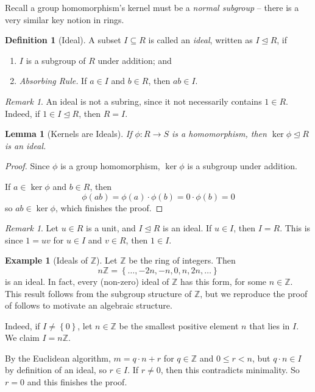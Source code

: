 \documentclass{article}
\newtheorem{lemma}[theorem]{Lemma}
\theoremstyle{definition}
\newtheorem{definition}[theorem]{Definition}
\newtheorem{example}[theorem]{Example}
\theoremstyle{remark}
\newtheorem{remark}[theorem]{Remark}
\newcommand{\pqty}[1]{\left(#1\right)}
\newcommand{\Bqty}[1]{\left\{#1\right\}}
\newcommand{\functiondomain}[3]{#1:#2\to #3}
\newcommand{\idealsub}{\trianglelefteq}
\newcommand{\ZZ}{\mathbb{Z}}
\begin{document}
Recall a group homomorphism's kernel must be a \emph{normal subgroup} -- there is a very similar key notion in rings.

\begin{definition}[Ideal]
    \label{def:ideal}%
    A subset \(I \subseteq R\) is called an \emph{ideal}, written as \(I \idealsub R\), if
    \begin{enumerate}
        \item \(I\) is a subgroup of \(R\) under addition; and
        \item \emph{Absorbing Rule.} If \(a \in I\) and \(b \in R\), then \(ab \in I\).
    \end{enumerate}
\end{definition}

\begin{remark}
    An ideal is not a subring, since it not necessarily contains \(1 \in R\). Indeed, if \(1 \in I \idealsub R\), then \(R = I\).
\end{remark}

\begin{lemma}[Kernels are Ideals]
    \label{lem:kernel-are-ideal}%
    If \(\functiondomain{\phi}{R}{S}\) is a homomorphism, then \(\ker \phi \idealsub R\) is an ideal.
\end{lemma}

\begin{proof}
    Since \(\phi\) is a group homomorphism, \(\ker \phi\) is a subgroup under addition.

    If \(a \in \ker \phi\) and \(b \in R\), then
    \[
        \phi\pqty{ab} = \phi\pqty{a} \cdot \phi\pqty{b} = 0 \cdot \phi\pqty{b} = 0
    \]
    so \(ab \in \ker \phi\), which finishes the proof.
\end{proof}

\begin{remark}
    Let \(u \in R\) is a unit, and \(I \idealsub R\) is an ideal. If \(u \in I\), then \(I = R\). This is since \(1 = u v\) for \(u \in I\) and \(v \in R\), then \(1 \in I\).
\end{remark}

\begin{example}[Ideals of \(\ZZ\)]
    \label{ex:ideals-of-z}%
    Let \(\ZZ\) be the ring of integers. Then
    \[
        n \ZZ = \Bqty{\ldots, -2n, -n, 0, n, 2n, \ldots}
    \]
    is an ideal. In fact, every (non-zero) ideal of \(\ZZ\) has this form, for some \(n \in \ZZ\). This result follows from the subgroup structure of \(\ZZ\), but we reproduce the proof of follows to motivate an algebraic structure.

    Indeed, if \(I \neq \Bqty{0}\), let \(n \in \ZZ\) be the smallest positive element \(n\) that lies in \(I\). We claim \(I = n\ZZ\).

    By the Euclidean algorithm, \(m = q \cdot n + r\) for \(q \in \ZZ\) and \(0 \leq r < n\), but \(q \cdot n \in I\) by definition of an ideal, so \(r \in I\). If \(r \neq 0\), then this contradicts minimality. So \(r = 0\) and this finishes the proof.
\end{example}
\end{document}
